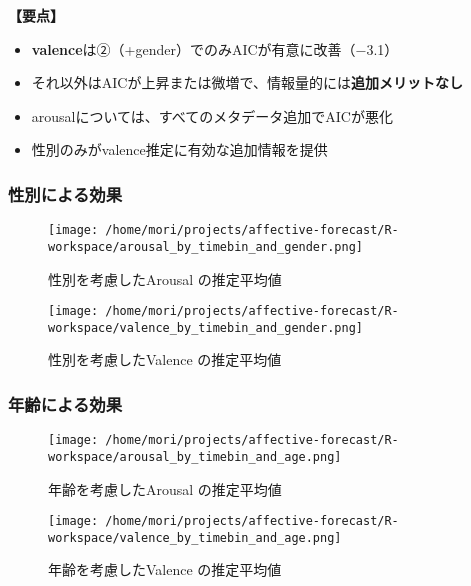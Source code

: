 \documentclass[a4paper,11pt]{article}
\begin{document}
\vspace{2ex}
\noindent \textbf{【要点】}

\begin{itemize}
\item \textbf{valence}は②（+gender）でのみAICが有意に改善（−3.1）
\item それ以外はAICが上昇または微増で、情報量的には\textbf{追加メリットなし}
\item arousalについては、すべてのメタデータ追加でAICが悪化
\item 性別のみがvalence推定に有効な追加情報を提供
\end{itemize}

\vspace{3ex}
\subsubsection*{性別による効果}
\begin{figure}[H]
  \centering
  \begin{minipage}{0.4\columnwidth}
     \centering
     \texttt{[image: /home/mori/projects/affective-forecast/R-workspace/arousal\_by\_timebin\_and\_gender.png]}
     \caption{性別を考慮したArousal の推定平均値}
  \end{minipage}
%
  \begin{minipage}{0.4\columnwidth}
     \centering
     \texttt{[image: /home/mori/projects/affective-forecast/R-workspace/valence\_by\_timebin\_and\_gender.png]}
     \caption{性別を考慮したValence の推定平均値}
  \end{minipage}
\end{figure}

\vspace{3ex}
\subsubsection*{年齢による効果}
\begin{figure}[H]
  \centering
  \begin{minipage}{0.4\columnwidth}
     \centering
     \texttt{[image: /home/mori/projects/affective-forecast/R-workspace/arousal\_by\_timebin\_and\_age.png]}
     \caption{年齢を考慮したArousal の推定平均値}
  \end{minipage}
%
  \begin{minipage}{0.4\columnwidth}
     \centering
     \texttt{[image: /home/mori/projects/affective-forecast/R-workspace/valence\_by\_timebin\_and\_age.png]}
     \caption{年齢を考慮したValence の推定平均値}
  \end{minipage}
\end{figure}
\end{document}
